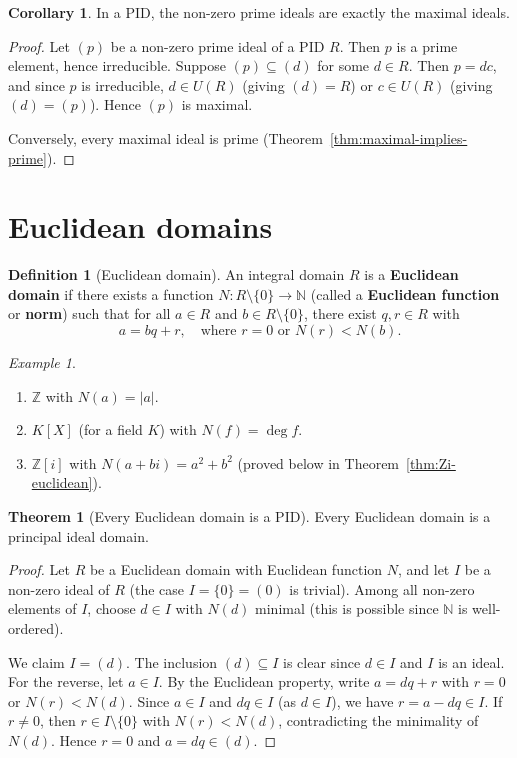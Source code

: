 \documentclass[12pt,a4paper,openany]{book}
\theoremstyle{definition}
\newtheorem{definition}{Definition}[chapter]
\newtheorem{theorem}{Theorem}[chapter]
\newtheorem{corollary}{Corollary}[chapter]
\theoremstyle{remark}
\newtheorem{example}{Example}[chapter]
\begin{document}
\begin{corollary}\label{cor:PID-prime-maximal}
In a PID, the non-zero prime ideals are exactly the maximal ideals.
\end{corollary}

\begin{proof}
Let $(p)$ be a non-zero prime ideal of a PID $R$. Then $p$ is a prime element, hence irreducible. Suppose $(p)\subseteq(d)$ for some $d\in R$. Then $p=dc$, and since $p$ is irreducible, $d\in U(R)$ (giving $(d)=R$) or $c\in U(R)$ (giving $(d)=(p)$). Hence $(p)$ is maximal.

Conversely, every maximal ideal is prime (Theorem~\ref{thm:maximal-implies-prime}).
\end{proof}

\section{Euclidean domains}\label{sec:euclidean}

\begin{definition}[Euclidean domain]\label{def:euclidean-domain}
An integral domain $R$ is a \textbf{Euclidean domain} if there exists a function $N\colon R\setminus\{0\}\to\mathbb{N}$ (called a \textbf{Euclidean function} or \textbf{norm}) such that for all $a\in R$ and $b\in R\setminus\{0\}$, there exist $q,r\in R$ with
\[
    a=bq+r,\quad\text{where } r=0 \text{ or } N(r)<N(b).
\]
\end{definition}

\begin{example}\label{ex:euclidean}
\begin{enumerate}[label=(\alph*)]
    \item $\mathbb{Z}$ with $N(a)=|a|$.
    \item $K[X]$ (for a field $K$) with $N(f)=\deg f$.
    \item $\mathbb{Z}[i]$ with $N(a+bi)=a^2+b^2$ (proved below in Theorem~\ref{thm:Zi-euclidean}).
\end{enumerate}
\end{example}

\begin{theorem}[Every Euclidean domain is a PID]\label{thm:euclidean-implies-PID}
Every Euclidean domain is a principal ideal domain.
\end{theorem}

\begin{proof}
Let $R$ be a Euclidean domain with Euclidean function $N$, and let $I$ be a non-zero ideal of $R$ (the case $I=\{0\}=(0)$ is trivial). Among all non-zero elements of $I$, choose $d\in I$ with $N(d)$ minimal (this is possible since $\mathbb{N}$ is well-ordered).

We claim $I=(d)$. The inclusion $(d)\subseteq I$ is clear since $d\in I$ and $I$ is an ideal. For the reverse, let $a\in I$. By the Euclidean property, write $a=dq+r$ with $r=0$ or $N(r)<N(d)$. Since $a\in I$ and $dq\in I$ (as $d\in I$), we have $r=a-dq\in I$. If $r\neq 0$, then $r\in I\setminus\{0\}$ with $N(r)<N(d)$, contradicting the minimality of $N(d)$. Hence $r=0$ and $a=dq\in(d)$.
\end{proof}
\end{document}
